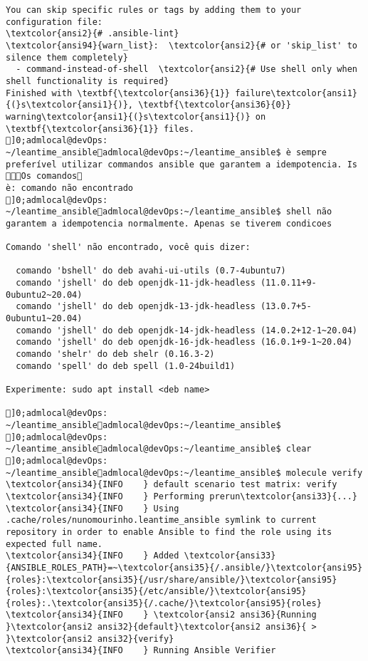 \documentclass{scrartcl}
\begin{document}
\begin{Verbatim}
You can skip specific rules or tags by adding them to your configuration file:
\textcolor{ansi2}{# .ansible-lint}
\textcolor{ansi94}{warn_list}:  \textcolor{ansi2}{# or 'skip_list' to silence them completely}
  - command-instead-of-shell  \textcolor{ansi2}{# Use shell only when shell functionality is required}
Finished with \textbf{\textcolor{ansi36}{1}} failure\textcolor{ansi1}{(}s\textcolor{ansi1}{)}, \textbf{\textcolor{ansi36}{0}} warning\textcolor{ansi1}{(}s\textcolor{ansi1}{)} on \textbf{\textcolor{ansi36}{1}} files.
]0;admlocal@devOps: ~/leantime_ansibleadmlocal@devOps:~/leantime_ansible$ è sempre preferível utilizar commandos ansible que garantem a idempotencia. Is Os comandos
è: comando não encontrado
]0;admlocal@devOps: ~/leantime_ansibleadmlocal@devOps:~/leantime_ansible$ shell não garantem a idempotencia normalmente. Apenas se tiverem condicoes

Comando 'shell' não encontrado, você quis dizer:

  comando 'bshell' do deb avahi-ui-utils (0.7-4ubuntu7)
  comando 'jshell' do deb openjdk-11-jdk-headless (11.0.11+9-0ubuntu2~20.04)
  comando 'jshell' do deb openjdk-13-jdk-headless (13.0.7+5-0ubuntu1~20.04)
  comando 'jshell' do deb openjdk-14-jdk-headless (14.0.2+12-1~20.04)
  comando 'jshell' do deb openjdk-16-jdk-headless (16.0.1+9-1~20.04)
  comando 'shelr' do deb shelr (0.16.3-2)
  comando 'spell' do deb spell (1.0-24build1)

Experimente: sudo apt install <deb name>

]0;admlocal@devOps: ~/leantime_ansibleadmlocal@devOps:~/leantime_ansible$ 
]0;admlocal@devOps: ~/leantime_ansibleadmlocal@devOps:~/leantime_ansible$ clear
]0;admlocal@devOps: ~/leantime_ansibleadmlocal@devOps:~/leantime_ansible$ molecule verify
\textcolor{ansi34}{INFO    } default scenario test matrix: verify
\textcolor{ansi34}{INFO    } Performing prerun\textcolor{ansi33}{...}
\textcolor{ansi34}{INFO    } Using .cache/roles/nunomourinho.leantime_ansible symlink to current repository in order to enable Ansible to find the role using its expected full name.
\textcolor{ansi34}{INFO    } Added \textcolor{ansi33}{ANSIBLE_ROLES_PATH}=~\textcolor{ansi35}{/.ansible/}\textcolor{ansi95}{roles}:\textcolor{ansi35}{/usr/share/ansible/}\textcolor{ansi95}{roles}:\textcolor{ansi35}{/etc/ansible/}\textcolor{ansi95}{roles}:.\textcolor{ansi35}{/.cache/}\textcolor{ansi95}{roles}
\textcolor{ansi34}{INFO    } \textcolor{ansi2 ansi36}{Running }\textcolor{ansi2 ansi32}{default}\textcolor{ansi2 ansi36}{ > }\textcolor{ansi2 ansi32}{verify}
\textcolor{ansi34}{INFO    } Running Ansible Verifier


\end{Verbatim}
\end{document}
